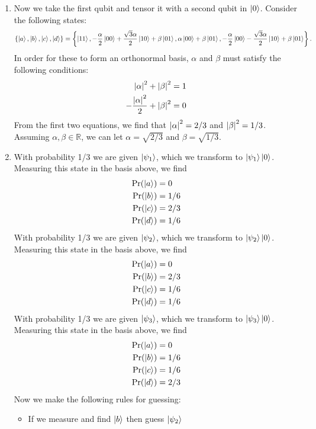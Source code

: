 \documentclass{article}
\theoremstyle{definition}
\newcommand{\al}{\alpha}
\newcommand{\be}{\beta}
\newcommand{\f}[2]{\frac{#1}{#2}}
\newcommand{\lc}{\left\{}
\newcommand{\rc}{\right\}}
\begin{document}
\begin{enumerate}[label=(\alph*)]
	
	\item Now we take the first qubit and tensor it with a second qubit in $\ket{0}$. Consider the following states:
	\begin{align*}
		\{ \ket{a}, \ket{b}, \ket{c}, \ket{d}  \} = \lc \ket{11}, -\f{\al}{2}\ket{00}+\f{\sqrt{3}\al}{2}\ket{10} + \be\ket{01}, \al\ket{00} + \be\ket{01}, -\f{\al}{2}\ket{00} - \f{\sqrt{3}\al}{2}\ket{10} + \be\ket{01} \rc.
	\end{align*}
	In order for these to form an orthonormal basis, $\al$ and $\be$ must satisfy the following conditions:
	\begin{align*}
		\abs{\al}^2 + \abs{\be}^2 &= 1\\
		-\f{\abs{\al}^2}{2} + \abs{\be}^2 &= 0 
	\end{align*}
	From the first two equations, we find that $\abs{\al}^2 = 2/3$ and $\abs{\be}^2 = 1/3$. Assuming $\al,\be\in \mathbb{R}$, we can let $\al = \sqrt{2/3}$ and $\be = \sqrt{1/3}$. 
	
	
	\item With probability 1/3 we are given $\ket{\psi_1}$, which we transform to $\ket{\psi_1}\ket{0}$. Measuring this state in the basis above, we find 
	\begin{align*}
		\Pr(\ket{a}) &= 0\\
		\Pr(\ket{b}) &= 1/6\\
		\Pr(\ket{c}) &= 2/3 \\
		\Pr(\ket{d}) &= 1/6 
	\end{align*}
	With probability 1/3 we are given $\ket{\psi_2}$, which we transform to $\ket{\psi_2}\ket{0}$. Measuring this state in the basis above, we find 
	\begin{align*}
		\Pr(\ket{a}) &= 0\\
		\Pr(\ket{b}) &= 2/3\\
		\Pr(\ket{c}) &= 1/6 \\
		\Pr(\ket{d}) &= 1/6
	\end{align*}
	With probability 1/3 we are given $\ket{\psi_3}$, which we transform to $\ket{\psi_3}\ket{0}$. Measuring this state in the basis above, we find 
	\begin{align*}
		\Pr(\ket{a}) &= 0\\
		\Pr(\ket{b}) &= 1/6\\
		\Pr(\ket{c}) &= 1/6 \\
		\Pr(\ket{d}) &= 2/3
	\end{align*}
	Now we make the following rules for guessing:
	\begin{itemize}
		\item If we measure and find $\ket{b}$ then guess $\ket{\psi_2}$
		

\end{itemize}
\end{enumerate}
\end{document}
